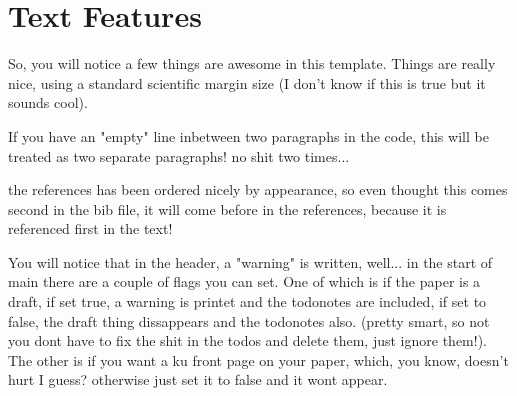 \clearpage
\section{Text Features}
So, you will notice a few things are awesome in this template.
Things are really nice, using a standard scientific margin size (I don't know if this is true but it sounds cool).

If you have an "empty" line inbetween two paragraphs in the code, this will be treated as two separate paragraphs! no
\text{\newline} shit two times...

the references has been ordered nicely by appearance, so even thought this \cite{dewey2010need} comes second in the bib file,
it will come before \cite{Lamport:1989:LDP:63364} in the references, because it is referenced first in the text!

You will notice that in the header, a "warning" is written, well... in the start of main there are a couple of flags you can set.
One of which is if the paper is a draft, if set true, a warning is printet and the todonotes are included, if set to false,
the draft thing dissappears and the todonotes also. (pretty smart, so not you dont have to fix the shit in the todos and delete them, just ignore them!).
The other is if you want a ku front page on your paper, which, you know, doesn't hurt I guess? otherwise just set it to false and it wont appear.